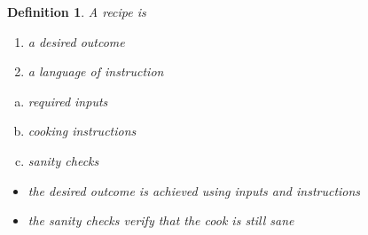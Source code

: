 \documentclass{beamer}
\newtheorem{deff}{Definition}
\begin{document}
\begin{frame}
\begin{deff}

A recipe is 

\begin{enumerate}
\item a desired outcome
\item a language of instruction
\end{enumerate} 
\begin{enumerate}[a.]
\item required inputs
\item cooking instructions 
\item sanity checks
\end{enumerate}
\begin{itemize}
\item the desired outcome is achieved using inputs and instructions
\item the sanity checks verify that the cook is still sane
\end{itemize}

\end{deff}
\end{frame}
\end{document}
